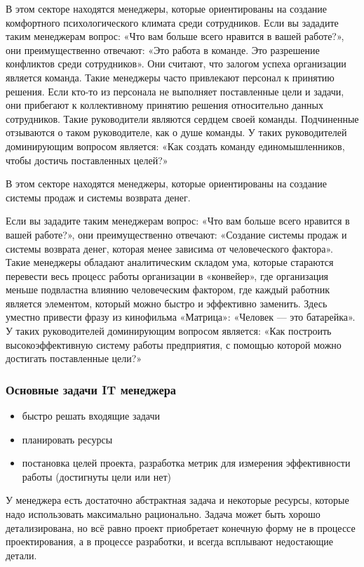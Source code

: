 \documentclass{../industrial-development}
\begin{document}
В этом секторе находятся менеджеры, которые ориентированы на создание комфортного психологического климата среди сотрудников. Если вы зададите таким менеджерам вопрос: «Что вам больше всего нравится в вашей работе?», они преимущественно отвечают: «Это работа в команде. Это разрешение конфликтов среди сотрудников». Они считают, что залогом успеха организации является команда. Такие менеджеры часто привлекают персонал к принятию решения. Если кто-то из персонала не выполняет поставленные цели и задачи, они прибегают к коллективному принятию решения относительно данных сотрудников. Такие руководители являются сердцем своей команды. Подчиненные отзываются о таком руководителе, как о душе команды. У таких руководителей доминирующим вопросом является: «Как создать команду единомышленников, чтобы достичь поставленных целей?»

В этом секторе находятся менеджеры, которые ориентированы на создание системы продаж и системы возврата денег.

Если вы зададите таким менеджерам вопрос: «Что вам больше всего нравится в вашей работе?», они преимущественно отвечают: «Создание системы продаж и системы возврата денег, которая менее зависима от человеческого фактора». Такие менеджеры обладают аналитическим складом ума, которые стараются перевести весь процесс работы организации в «конвейер», где организация меньше подвластна влиянию человеческим фактором, где каждый работник является элементом, который можно быстро и эффективно заменить. Здесь уместно привести фразу из кинофильма «Матрица»: «Человек — это батарейка».
У таких руководителей доминирующим вопросом является: «Как построить высокоэффективную систему работы предприятия, с помощью которой можно достигать поставленные цели?»
~\cite{Managers_thinking_style}

\begin{frame} \frametitle{Основные задачи IT менеджера}
	\begin{itemize}
		\item быстро решать входящие задачи
		\item планировать ресурсы
		\item постановка целей проекта, разработка метрик для измерения эффективности работы (достигнуты цели или нет)
	\end{itemize}
\end{frame}
\lecturenotes
У менеджера есть достаточно абстрактная задача и некоторые ресурсы, которые надо использовать максимально рационально. Задача может быть хорошо детализирована, но всё равно проект приобретает конечную форму не в процессе проектирования, а в процессе разработки, и всегда всплывают недостающие детали.
\end{document}
